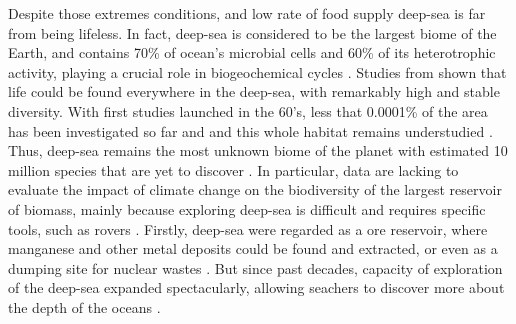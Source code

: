 Despite those extremes conditions, and low rate of food supply deep-sea is far from being lifeless. In fact, deep-sea is considered to be the largest biome of the Earth, and contains 70\% of ocean's microbial cells and 60\% of its heterotrophic activity, playing a crucial role in biogeochemical cycles \citep{salazar2016}. Studies from \citet{grassle1992,parkes1994,todo2005} shown that life could be found everywhere in the deep-sea, with remarkably high and stable diversity. With first studies launched in the 60's, less that 0.0001\% of the area has been investigated so far and and this whole habitat remains understudied \citep{danovaro2017,richards2019}. Thus, deep-sea remains the most unknown biome of the planet with estimated 10 million species that are yet to discover \citep{danovaro2017,grassle1992}. In particular, data are lacking to evaluate the impact of climate change on the biodiversity of the largest reservoir of biomass, mainly because exploring deep-sea is difficult and requires specific tools, such as rovers \citep{danovaro2008,danovaro2014}. Firstly, deep-sea were regarded as a ore reservoir, where manganese and other metal deposits could be found and extracted, or even as a dumping site for nuclear wastes \citep{baker2020,gillet2013,halfar2002}. But since past decades, capacity of exploration of the deep-sea expanded spectacularly, allowing seachers to discover more about the depth of the oceans \citep{danovaro2014}.

